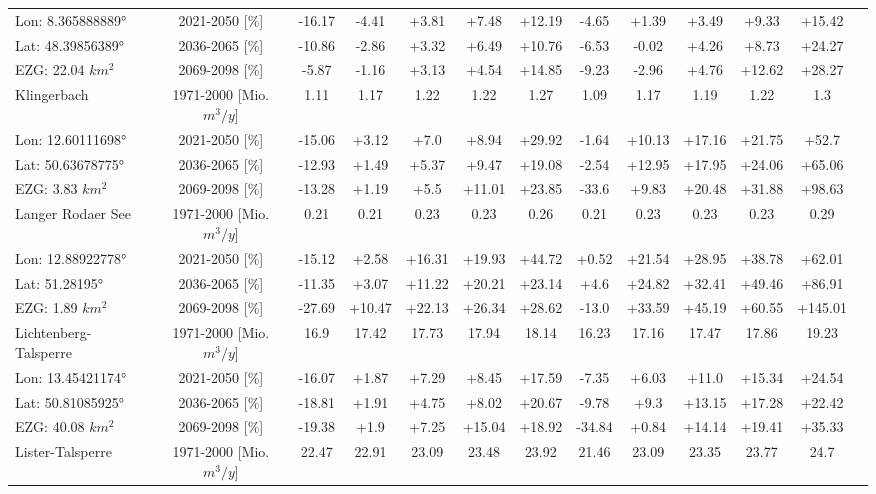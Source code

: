 \begin{longtable}{@{\extracolsep{\fill}}lc|ccccc||cccccc}
\cline{2-12} 
Lon: 8.365888889° & 2021-2050 [\%]  & -16.17 & -4.41 & +3.81 & +7.48 & +12.19 & -4.65 & +1.39 & +3.49 & +9.33 & +15.42\\ 
Lat: 48.39856389° & 2036-2065 [\%]  & -10.86 & -2.86 & +3.32 & +6.49 & +10.76 & -6.53 & -0.02 & +4.26 & +8.73 & +24.27\\ 
EZG: 22.04 $km^2$ & 2069-2098 [\%]  & -5.87 & -1.16 & +3.13 & +4.54 & +14.85 & -9.23 & -2.96 & +4.76 & +12.62 & +28.27\\ 
\hline 
Klingerbach & 1971-2000 [Mio. $m^3/y$]  & 1.11 & 1.17 & 1.22 & 1.22 & 1.27 & 1.09 & 1.17 & 1.19 & 1.22 & 1.3\\ 
\cline{2-12} 
Lon: 12.60111698° & 2021-2050 [\%]  & -15.06 & +3.12 & +7.0 & +8.94 & +29.92 & -1.64 & +10.13 & +17.16 & +21.75 & +52.7\\ 
Lat: 50.63678775° & 2036-2065 [\%]  & -12.93 & +1.49 & +5.37 & +9.47 & +19.08 & -2.54 & +12.95 & +17.95 & +24.06 & +65.06\\ 
EZG: 3.83 $km^2$ & 2069-2098 [\%]  & -13.28 & +1.19 & +5.5 & +11.01 & +23.85 & -33.6 & +9.83 & +20.48 & +31.88 & +98.63\\ 
\hline 
Langer Rodaer See & 1971-2000 [Mio. $m^3/y$]  & 0.21 & 0.21 & 0.23 & 0.23 & 0.26 & 0.21 & 0.23 & 0.23 & 0.23 & 0.29\\ 
\cline{2-12} 
Lon: 12.88922778° & 2021-2050 [\%]  & -15.12 & +2.58 & +16.31 & +19.93 & +44.72 & +0.52 & +21.54 & +28.95 & +38.78 & +62.01\\ 
Lat: 51.28195° & 2036-2065 [\%]  & -11.35 & +3.07 & +11.22 & +20.21 & +23.14 & +4.6 & +24.82 & +32.41 & +49.46 & +86.91\\ 
EZG: 1.89 $km^2$ & 2069-2098 [\%]  & -27.69 & +10.47 & +22.13 & +26.34 & +28.62 & -13.0 & +33.59 & +45.19 & +60.55 & +145.01\\ 
\hline 
Lichtenberg-Talsperre & 1971-2000 [Mio. $m^3/y$]  & 16.9 & 17.42 & 17.73 & 17.94 & 18.14 & 16.23 & 17.16 & 17.47 & 17.86 & 19.23\\ 
\cline{2-12} 
Lon: 13.45421174° & 2021-2050 [\%]  & -16.07 & +1.87 & +7.29 & +8.45 & +17.59 & -7.35 & +6.03 & +11.0 & +15.34 & +24.54\\ 
Lat: 50.81085925° & 2036-2065 [\%]  & -18.81 & +1.91 & +4.75 & +8.02 & +20.67 & -9.78 & +9.3 & +13.15 & +17.28 & +22.42\\ 
EZG: 40.08 $km^2$ & 2069-2098 [\%]  & -19.38 & +1.9 & +7.25 & +15.04 & +18.92 & -34.84 & +0.84 & +14.14 & +19.41 & +35.33\\ 
\hline 
Lister-Talsperre & 1971-2000 [Mio. $m^3/y$]  & 22.47 & 22.91 & 23.09 & 23.48 & 23.92 & 21.46 & 23.09 & 23.35 & 23.77 & 24.7\\ 

\end{longtable}
